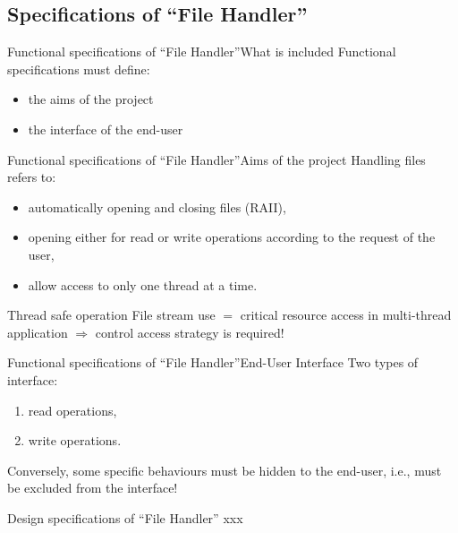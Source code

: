 \documentclass[11pt,handout]{beamer}
\begin{document}
	
	\subsection{Specifications of \enquote{File Handler}}
	
		\begin{frame}{Functional specifications of \enquote{File Handler}}{What is included}
			Functional specifications must define:
			\begin{itemize}
				\item the aims of the project
				\item the interface of the end-user
			\end{itemize}
		\end{frame}
	
		\begin{frame}{Functional specifications of \enquote{File Handler}}{Aims of the project}
			Handling files refers to:
			\begin{itemize}
				\item automatically opening and closing files (RAII),
				\item opening either for read or write operations according to the request of the user,
				\item allow access to only one thread at a time.
			\end{itemize}
			
			\begin{alertblock}{Thread safe operation}
				File stream use $=$ critical resource access in multi-thread application $\Longrightarrow$ control access strategy is required!
			\end{alertblock}
		\end{frame}
	
		\begin{frame}{Functional specifications of \enquote{File Handler}}{End-User Interface}
			Two types of interface:
			\begin{enumerate}
				\item read operations,
				\item write operations.
			\end{enumerate}
		
			Conversely, some specific behaviours must be hidden to the end-user, i.e., must be excluded from the interface!
		\end{frame}
	
		\begin{frame}{Design specifications of \enquote{File Handler}}
			xxx
		\end{frame}
	
	
	
\end{document}
